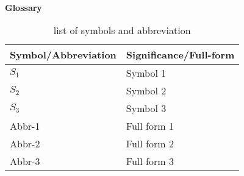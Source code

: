 ~~~
\vspace{1.5cm}

\begin{center}
    \sffamily \Large \textbf{\textcolor{Soft-Blue}{Glossary}}
    \vspace{1cm}
\end{center}

\begin{table}[ht]
\centering
\caption{list of symbols and abbreviation}
\begin{tabular}[t]
{m{}m{}}
\toprule
\textbf{Symbol/Abbreviation}&\textbf{Significance/Full-form}\\
\midrule
$S_1$ & Symbol 1\\
$S_2$ & Symbol 2\\
$S_3$ & Symbol 3\\
Abbr-1 &  Full form 1\\
Abbr-2 &  Full form 2\\
Abbr-3 &  Full form 3\\
\bottomrule
\end{tabular}
\end{table}